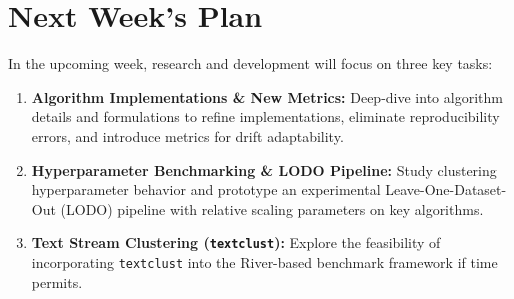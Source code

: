 \section{Next Week's Plan}
\label{sec:next_week}

In the upcoming week, research and development will focus on three key tasks:

\begin{enumerate}[label=\textbf{N\arabic*.},leftmargin=2.2em,itemsep=4pt]
  \item \textbf{Algorithm Implementations \& New Metrics:} Deep-dive into algorithm details and formulations to refine implementations, eliminate reproducibility errors, and introduce metrics for drift adaptability.
  \item \textbf{Hyperparameter Benchmarking \& LODO Pipeline:} Study clustering hyperparameter behavior and prototype an experimental Leave-One-Dataset-Out (LODO) pipeline with relative scaling parameters on key algorithms.
  \item \textbf{Text Stream Clustering (\texttt{textclust}):} Explore the feasibility of incorporating \texttt{textclust} into the River-based benchmark framework if time permits.
\end{enumerate}
